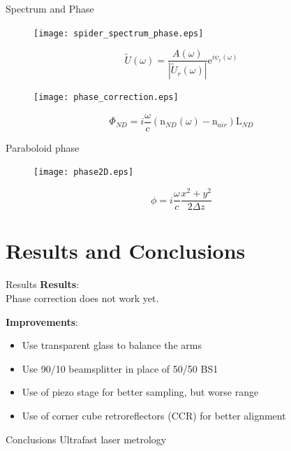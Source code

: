 \documentclass[11pt]{beamer}
\begin{document}
\begin{frame}{Spectrum and Phase}
\vspace{-15pt}
\begin{figure}
	\centering
	\texttt{[image: spider\_spectrum\_phase.eps]}
\end{figure}
\vspace{-5pt}
\begin{equation*}
\tilde{U}(\omega) = \frac{A(\omega)}{|\tilde{U}_r(\omega)|}\mathrm{e}^{i\psi_r(\omega)}
\end{equation*}
\end{frame}

\begin{frame}
\begin{figure}
	\texttt{[image: phase\_correction.eps]}
\end{figure}
\begin{equation}
\Phi_{ND} = i\frac{\omega}{c}(\mathrm{n}_{ND}(\omega)-\mathrm{n}_{air})\mathrm{L}_{ND}
	\label{eq_ND_phase}
\end{equation}
\end{frame}

\begin{frame}{Paraboloid phase}
\begin{figure}
	\texttt{[image: phase2D.eps]}
\end{figure}
\vspace{-15pt}
\begin{equation}
\phi = i\frac{\omega}{c}\frac{x^2 + y^2}{2\Delta z}
	\label{eq_paraboloid}
\end{equation}
\end{frame}

\section{Results and Conclusions}
\begin{frame}{Results}
\textbf{Results}:\\
	Phase correction does not work yet.

	\vspace{5pt}
\textbf{Improvements}:\\
	\begin{itemize}
		\item Use transparent glass to balance the arms
		\item Use 90/10 beamsplitter in place of 50/50 BS1
		\item Use of piezo stage for better sampling, but worse range
		\vspace{5pt}
		\item Use of corner cube retroreflectors (CCR) for better alignment
	\end{itemize}
	
	
\end{frame}
\begin{frame}{Conclusions}
Ultrafast laser metrology
\end{frame}
\end{document}
